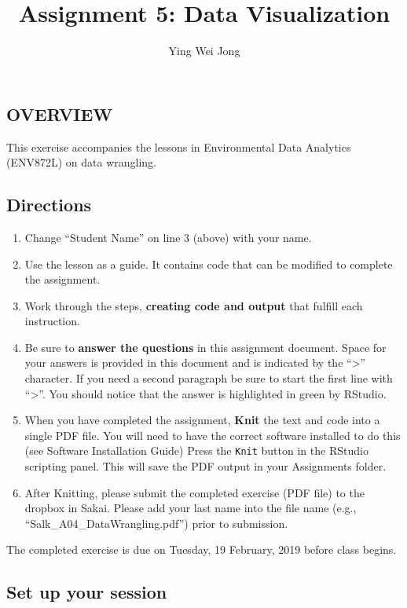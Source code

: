 \documentclass[]{article}
\title{Assignment 5: Data Visualization}
\author{Ying Wei Jong}
\date{}
\providecommand{\tightlist}{%
  \setlength{\itemsep}{0pt}\setlength{\parskip}{0pt}}
\begin{document}
\maketitle

\subsection{OVERVIEW}\label{overview}

This exercise accompanies the lessons in Environmental Data Analytics
(ENV872L) on data wrangling.

\subsection{Directions}\label{directions}

\begin{enumerate}
\def\labelenumi{\arabic{enumi}.}
\tightlist
\item
  Change ``Student Name'' on line 3 (above) with your name.
\item
  Use the lesson as a guide. It contains code that can be modified to
  complete the assignment.
\item
  Work through the steps, \textbf{creating code and output} that fulfill
  each instruction.
\item
  Be sure to \textbf{answer the questions} in this assignment document.
  Space for your answers is provided in this document and is indicated
  by the ``\textgreater{}'' character. If you need a second paragraph be
  sure to start the first line with ``\textgreater{}''. You should
  notice that the answer is highlighted in green by RStudio.
\item
  When you have completed the assignment, \textbf{Knit} the text and
  code into a single PDF file. You will need to have the correct
  software installed to do this (see Software Installation Guide) Press
  the \texttt{Knit} button in the RStudio scripting panel. This will
  save the PDF output in your Assignments folder.
\item
  After Knitting, please submit the completed exercise (PDF file) to the
  dropbox in Sakai. Please add your last name into the file name (e.g.,
  ``Salk\_A04\_DataWrangling.pdf'') prior to submission.
\end{enumerate}

The completed exercise is due on Tuesday, 19 February, 2019 before class
begins.

\subsection{Set up your session}\label{set-up-your-session}
\end{document}
